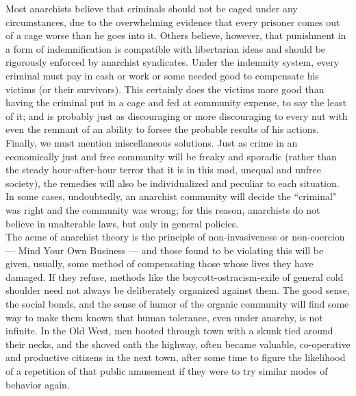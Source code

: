 Most anarchists believe that criminals should not be caged under any circumstances, due to the overwhelming evidence that every prisoner comes out of a cage worse than he goes into it. Others believe, however, that punishment in a form of indemnification is compatible with libertarian ideas and should be rigorously enforced by anarchist syndicates. Under the indemnity system, every criminal must pay in cash or work or some needed good to compensate his victims (or their survivors). This certainly does the victims more good than having the criminal put in a cage and fed at community expense, to say the least of it; and is probably just as discouraging or more discouraging to every nut with even the remnant of an ability to forsee the probable results of his actions.\\
Finally, we must mention miscellaneous solutions. Just as crime in an economically just and free community will be freaky and sporadic (rather than the steady hour-after-hour terror that it is in this mad, unequal and unfree society), the remedies will also be individualized and peculiar to each situation. In some cases, undoubtedly, an anarchist community will decide the ``criminal" was right and the community was wrong; for this reason, anarchists do not believe in unalterable laws, but only in general policies.\\
The acme of anarchist theory is the principle of non-invasiveness or non-coercion --- Mind Your Own Business --- and those found to be violating this will be given, usually, some method of compensating those whose lives they have damaged. If they refuse, methods like the boycott-ostracism-exile of general cold shoulder need not always be deliberately organized against them. The good sense, the social bonds, and the sense of humor of the organic community will find some way to make them known that human tolerance, even under anarchy, is not infinite. In the Old West, men booted through town with a skunk tied around their necks, and the shoved onth the highway, often became valuable, co-operative and productive citizens in the next town, after some time to figure the likelihood of a repetition of that public amusement if they were to try similar modes of behavior again.